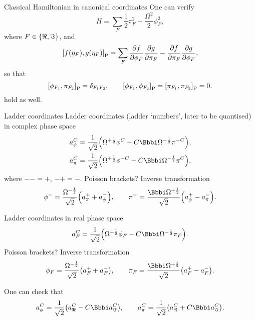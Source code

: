 \documentclass[a4paper]{article}
\newcommand{\Poibr}[1]{\sbr{#1}_\text{P}}
\newcommand{\tR}{\Re}
\newcommand{\tI}{\Im}
\begin{document}
\begin{nameddef}{Classical Hamiltonian in canonical coordinates}
One can verify
\begin{equation}
H = \sum_{F} \frac{1}{2} \pi_F^2 + \frac{\Omega^2}{2} \phi_F^2,
\end{equation}
where $F \in \cbr{\tR, \tI}$, and
\begin{equation}
\Poibr{\rfun{f}{\eta_F}, \rfun{g}{\eta_F}} = \sum_F
\frpa{f}{\phi_F}\frpa{g}{\pi_F} - \frpa{f}{\pi_F}\frpa{g}{\phi_F},
\end{equation}
so that
\begin{equation}
\Poibr{\phi_{F_1}, \pi_{F_2}} = \delta_{F_1 F_2},\qquad
\Poibr{\phi_{F_1}, \phi_{F_2}} = \Poibr{\pi_{F_1}, \pi_{F_2}} = 0.
\end{equation}
hold as well.
\end{nameddef} %

\begin{nameddef}{Ladder coordinates}
Ladder coordinates (ladder `numbers', later to be quantised) in complex phase
space
\begin{align}
a_\phi^C &= \frac{1}{\sqrt{2}} \rbr{\Omega^{+\frac{1}{2}}\phi^{C} - C \ii
\Omega^{-\frac{1}{2}} \pi^{-C}}, \\
a_\pi^C &= \frac{1}{\sqrt{2}} \rbr{\Omega^{+\frac{1}{2}}\phi^{-C} - C \ii
\Omega^{-\frac{1}{2}} \pi^{C}},
\end{align}
where $-- = +$, $-+ = -$.
Poisson brackets? Inverse transformation
\begin{equation}
\phi^- = \frac{\Omega^{-\frac{1}{2}}}{\sqrt{2}}\rbr{a_\pi^+ + a_\phi^-},\qquad
\pi^- = \frac{\ii\Omega^{+\frac{1}{2}}}{\sqrt{2}}\rbr{a_\phi^+ - a_\pi^-}.
\end{equation}


Ladder coordinates in real phase space
\begin{equation}
a_F^C = \frac{1}{\sqrt{2}} \rbr{\Omega^{+\frac{1}{2}}\phi_F - C \ii
\Omega^{-\frac{1}{2}} \pi_F}.
\end{equation}
Poisson brackets? Inverse transformation
\begin{equation}
\phi_F = \frac{\Omega^{-\frac{1}{2}}}{\sqrt{2}}\rbr{a_F^+ + a_F^-},\qquad
\pi_F = \frac{\ii\Omega^{+\frac{1}{2}}}{\sqrt{2}}\rbr{a_F^+ - a_F^-}.
\end{equation}


One can check that
\begin{equation}
a_\phi^C = \frac{1}{\sqrt{2}}\rbr{a_\tR^C - C \ii a_\tI^C},\qquad
a_\pi^C = \frac{1}{\sqrt{2}}\rbr{a_\tR^C + C \ii a_\tI^C}.
\end{equation}


\end{nameddef} %
\end{document}

